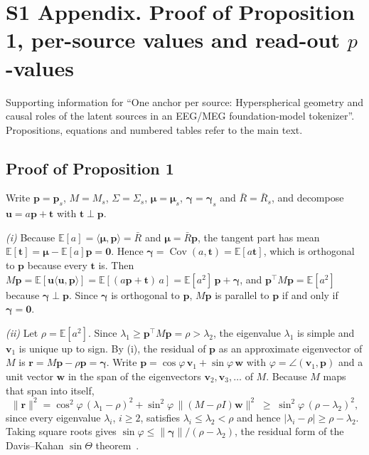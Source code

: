 \documentclass[10pt,letterpaper]{article}
\newcommand{\E}{\mathbb{E}}
\newcommand{\Rbar}{\bar{R}}
\newcommand{\anchor}{\bm{p}}
\newcommand{\uvec}{\bm{u}}
\newcommand{\tvec}{\bm{t}}
\begin{document}
\section*{S1 Appendix. Proof of Proposition 1, per-source values and read-out $p$-values}

Supporting information for ``One anchor per source: Hyperspherical geometry and causal roles of the latent
sources in an EEG/MEG foundation-model tokenizer''. Propositions, equations and numbered tables refer to the
main text.

\subsection*{Proof of Proposition 1}

Write $\anchor=\anchor_s$, $M=M_s$, $\Sigma=\Sigma_s$, $\bm{\mu}=\bm{\mu}_s$,
$\bm{\gamma}=\bm{\gamma}_s$ and $\Rbar=\Rbar_s$, and decompose $\uvec=a\anchor+\tvec$ with
$\tvec\perp\anchor$.

\emph{(i)} Because $\E[a]=\langle\bm{\mu},\anchor\rangle=\Rbar$ and $\bm{\mu}=\Rbar\anchor$,
the tangent part has mean $\E[\tvec]=\bm{\mu}-\E[a]\anchor=\bm{0}$. Hence
$\bm{\gamma}=\operatorname{Cov}(a,\tvec)=\E[a\tvec]$, which is orthogonal to $\anchor$ because
every $\tvec$ is. Then
$M\anchor=\E[\uvec\langle\uvec,\anchor\rangle]=\E[(a\anchor+\tvec)\,a]
=\E[a^{2}]\,\anchor+\bm{\gamma}$, and $\anchor^{\top}M\anchor=\E[a^{2}]$ because
$\bm{\gamma}\perp\anchor$. Since $\bm{\gamma}$ is orthogonal to $\anchor$, $M\anchor$ is parallel
to $\anchor$ if and only if $\bm{\gamma}=\bm{0}$.

\emph{(ii)} Let $\rho=\E[a^{2}]$. Since $\lambda_1\geq\anchor^{\top}M\anchor=\rho>\lambda_2$, the
eigenvalue $\lambda_1$ is simple and $\bm{v}_1$ is unique up to sign. By (i), the residual of $\anchor$ as an approximate
eigenvector of $M$ is $\bm{r}=M\anchor-\rho\anchor=\bm{\gamma}$. Write
$\anchor=\cos\varphi\,\bm{v}_1+\sin\varphi\,\bm{w}$ with $\varphi=\angle(\bm{v}_1,\anchor)$
and a unit vector $\bm{w}$ in the span of the eigenvectors $\bm{v}_2,\bm{v}_3,\dots$ of $M$.
Because $M$ maps that span into itself,
\[
  \lVert\bm{r}\rVert^{2}=\cos^{2}\!\varphi\,(\lambda_1-\rho)^{2}
  +\sin^{2}\!\varphi\,\lVert(M-\rho I)\bm{w}\rVert^{2}
  \;\geq\;\sin^{2}\!\varphi\,(\rho-\lambda_2)^{2},
\]
since every eigenvalue $\lambda_i$, $i\geq2$, satisfies $\lambda_i\leq\lambda_2<\rho$ and
hence $|\lambda_i-\rho|\geq\rho-\lambda_2$. Taking square roots gives
$\sin\varphi\leq\lVert\bm{\gamma}\rVert/(\rho-\lambda_2)$, the residual form of the
Davis--Kahan $\sin\Theta$ theorem~\cite{davis1970rotation}.
\end{document}
